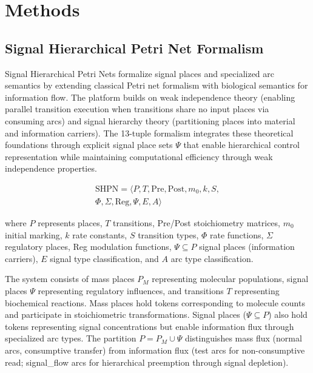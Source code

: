 \documentclass[twocolumn,11pt]{article}
\begin{document}
\section{Methods}

\subsection{Signal Hierarchical Petri Net Formalism}

Signal Hierarchical Petri Nets formalize signal places and specialized arc semantics by extending classical Petri net formalism with biological semantics for information flow. The platform builds on weak independence theory (enabling parallel transition execution when transitions share no input places via consuming arcs) and signal hierarchy theory (partitioning places into material and information carriers). The 13-tuple formalism integrates these theoretical foundations through explicit signal place sets $\Psi$ that enable hierarchical control representation while maintaining computational efficiency through weak independence properties.

\begin{equation*}
\begin{split}
\text{SHPN} = \langle P, T, \text{Pre}, \text{Post}, m_0, k, S, \\
\Phi, \Sigma, \text{Reg}, \Psi, E, A \rangle
\end{split}
\end{equation*}

where $P$ represents places, $T$ transitions, Pre/Post stoichiometry matrices, $m_0$ initial marking, $k$ rate constants, $S$ transition types, $\Phi$ rate functions, $\Sigma$ regulatory places, Reg modulation functions, $\Psi \subseteq P$ signal places (information carriers), $E$ signal type classification, and $A$ arc type classification.

The system consists of mass places $P_M$ representing molecular populations, signal places $\Psi$ representing regulatory influences, and transitions $T$ representing biochemical reactions. Mass places hold tokens corresponding to molecule counts and participate in stoichiometric transformations. Signal places ($\Psi \subseteq P$) also hold tokens representing signal concentrations but enable information flux through specialized arc types. The partition $P = P_M \cup \Psi$ distinguishes mass flux (normal arcs, consumptive transfer) from information flux (test arcs for non-consumptive read; signal\_flow arcs for hierarchical preemption through signal depletion).
\end{document}
